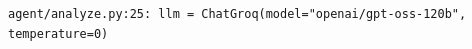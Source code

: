 \begin{lstlisting}
agent/analyze.py:25: llm = ChatGroq(model="openai/gpt-oss-120b", temperature=0)
\end{lstlisting}

